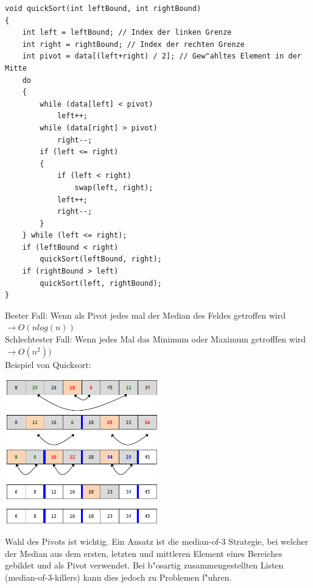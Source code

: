 \begin{lstlisting}[style=C]
void quickSort(int leftBound, int rightBound)
{
	int left = leftBound; // Index der linken Grenze
	int right = rightBound; // Index der rechten Grenze
	int pivot = data[(left+right) / 2]; // Gew"ahltes Element in der Mitte
	do
	{
		while (data[left] < pivot)
			left++;
		while (data[right] > pivot)
			right--;
		if (left <= right)
		{
			if (left < right)
				swap(left, right);
			left++;
			right--;
		}
	} while (left <= right);
	if (leftBound < right)
		quickSort(leftBound, right);
	if (rightBound > left)
		quickSort(left, rightBound);
}
\end{lstlisting} 
Bester Fall: Wenn als Pivot jedes mal der Median des Feldes getroffen wird $\rightarrow O(nlog(n))$\\
Schlechtester Fall: Wenn jedes Mal das Minimum oder Maximum getrofffen wird $\rightarrow O(n^2))$\\

Beispiel von Quicksort: \\
\begin{center}
{\includegraphics[width=0.5\textwidth]{images/Algorithmen/Quicksort.png}}
\label{Fig: Quicksort}
\end{center}

Wahl des Pivots ist wichtig. Ein Ansatz ist die median-of-3 Strategie, bei welcher der Median aus dem ersten, letzten und mittleren Element eines Bereiches gebildet und als Pivot verwendet. Bei b"osartig zusammengestellten Listen (median-of-3-killers) kann dies jedoch zu Problemen f"uhren.\\

